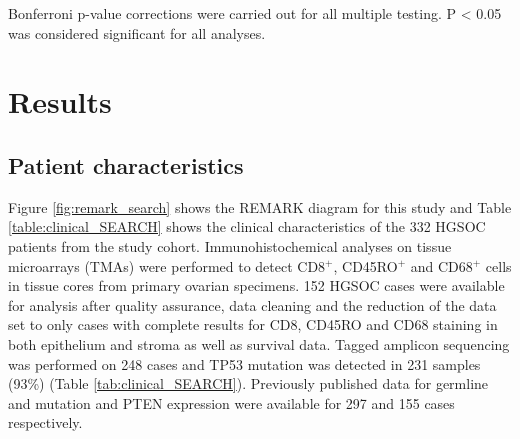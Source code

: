 Bonferroni p-value corrections were carried out for all multiple testing. P < 0.05 was considered significant for all analyses. 


\section{Results}
 

\subsection{Patient characteristics}
Figure {\ref{fig:remark_search}} shows the REMARK diagram for this study and Table \ref{table:clinical_SEARCH} shows the clinical characteristics of the 332 HGSOC patients from the study cohort. Immunohistochemical analyses on tissue microarrays (TMAs) were performed to detect CD8$^+$, CD45RO$^+$ and CD68$^+$ cells in tissue cores from primary ovarian specimens.  152 HGSOC cases were available for analysis after quality assurance, data cleaning and the reduction of the data set to only cases with complete results for CD8, CD45RO and CD68 staining in both epithelium and stroma as well as survival data. 
Tagged amplicon sequencing was performed on 248 cases and TP53 mutation was detected in 231 samples (93\%) (Table \ref{tab:clinical_SEARCH}). Previously published data for germline   and  mutation and PTEN expression were available for 297 and 155 cases respectively\cite{17,20}.

